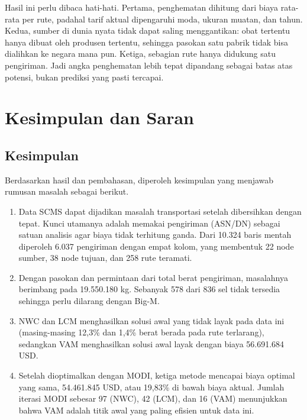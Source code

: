 \documentclass[a4paper,11pt]{article}
\begin{document}
Hasil ini perlu dibaca hati-hati. Pertama, penghematan dihitung dari biaya rata-rata per rute, padahal tarif aktual dipengaruhi moda, ukuran muatan, dan tahun. Kedua, sumber di dunia nyata tidak dapat saling menggantikan: obat tertentu hanya dibuat oleh produsen tertentu, sehingga pasokan satu pabrik tidak bisa dialihkan ke negara mana pun. Ketiga, sebagian rute hanya didukung satu pengiriman. Jadi angka penghematan lebih tepat dipandang sebagai batas atas potensi, bukan prediksi yang pasti tercapai.

\section{Kesimpulan dan Saran}
\subsection{Kesimpulan}
Berdasarkan hasil dan pembahasan, diperoleh kesimpulan yang menjawab rumusan masalah sebagai berikut.
\begin{enumerate}
  \item Data SCMS dapat dijadikan masalah transportasi setelah dibersihkan dengan tepat. Kunci utamanya adalah memakai pengiriman (ASN/DN) sebagai satuan analisis agar biaya tidak terhitung ganda. Dari 10.324 baris mentah diperoleh 6.037 pengiriman dengan empat kolom, yang membentuk 22 node sumber, 38 node tujuan, dan 258 rute teramati.
  \item Dengan pasokan dan permintaan dari total berat pengiriman, masalahnya berimbang pada 19.550.180 kg. Sebanyak 578 dari 836 sel tidak tersedia sehingga perlu dilarang dengan Big-M.
  \item NWC dan LCM menghasilkan solusi awal yang tidak layak pada data ini (masing-masing 12,3\% dan 1,4\% berat berada pada rute terlarang), sedangkan VAM menghasilkan solusi awal layak dengan biaya 56.691.684 USD.
  \item Setelah dioptimalkan dengan MODI, ketiga metode mencapai biaya optimal yang sama, 54.461.845 USD, atau 19,83\% di bawah biaya aktual. Jumlah iterasi MODI sebesar 97 (NWC), 42 (LCM), dan 16 (VAM) menunjukkan bahwa VAM adalah titik awal yang paling efisien untuk data ini.
\end{enumerate}
\end{document}

